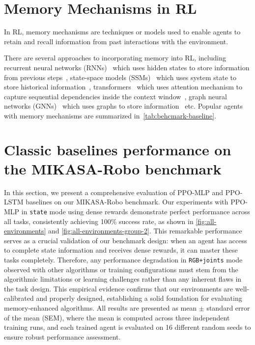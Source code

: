 \section{Memory Mechanisms in RL}
\label{app:memory-mechanisms}
In RL, memory mechanisms are techniques or models used to enable agents to retain and recall information from past interactions with the environment. 

There are several approaches to incorporating memory into RL, including recurrent neural networks (RNNs)~\citep{rnn,lstm,gru} which uses hidden states to store information from previous steps~\citep{rpg,drqn}, state-space models (SSMs)~\citep{gu2021efficiently,s5,gu2023mamba} which uses system state to store historical information~\citep{rssm,r2i}, transformers~\citep{vaswani2017attention} which uses attention mechanism to capture sequential dependencies inside the context window~\citep{gtrxl,hcam,shine_rl}, graph neural networks (GNNs)~\citep{gnn} which uses graphs to store information~\cite{vmg,gbmr} etc. Popular agents with memory mechanisms are summarized in~\autoref{tab:behcmark-baseline}.


\section{Classic baselines performance on the MIKASA-Robo benchmark}
\label{app:results}

In this section, we present a comprehensive evaluation of PPO-MLP and PPO-LSTM baselines on our MIKASA-Robo benchmark. Our experiments with PPO-MLP in \texttt{state} mode using dense rewards demonstrate perfect performance across all tasks, consistently achieving 100\% success rate, as shown in \autoref{fig:all-environments} and \autoref{fig:all-environments-group-2}. This remarkable performance serves as a crucial validation of our benchmark design: when an agent has access to complete state information and receives dense rewards, it can master these tasks completely. Therefore, any performance degradation in \texttt{RGB+joints} mode observed with other algorithms or training configurations must stem from the algorithmic limitations or learning challenges rather than any inherent flaws in the task design. This empirical evidence confirms that our environments are well-calibrated and properly designed, establishing a solid foundation for evaluating memory-enhanced algorithms. All results are presented as mean $\pm$ standard error of the mean (SEM), where the mean is computed across three independent training runs, and each trained agent is evaluated on 16 different random seeds to ensure robust performance assessment.

